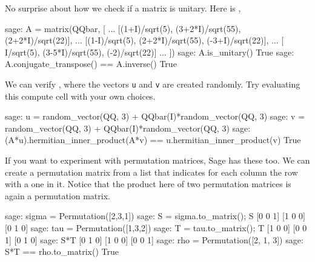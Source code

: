 No surprise about how we check if a matrix is unitary.  Here is ,
%
\begin{sageexample}
sage: A = matrix(QQbar, [
...       [(1+I)/sqrt(5), (3+2*I)/sqrt(55), (2+2*I)/sqrt(22)],
...       [(1-I)/sqrt(5), (2+2*I)/sqrt(55),  (-3+I)/sqrt(22)],
...       [    I/sqrt(5), (3-5*I)/sqrt(55),    (-2)/sqrt(22)]
...                     ])
sage: A.is_unitary()
True
sage: A.conjugate_transpose() == A.inverse()
True
\end{sageexample}
%
We can verify , where the vectors \verb?u? and \verb?v? are created randomly.  Try evaluating this compute cell with your own choices.
%
\begin{sageexample}
sage: u = random_vector(QQ, 3) + QQbar(I)*random_vector(QQ, 3)
sage: v = random_vector(QQ, 3) + QQbar(I)*random_vector(QQ, 3)
sage: (A*u).hermitian_inner_product(A*v) == u.hermitian_inner_product(v)
True
\end{sageexample}
%
If you want to experiment with permutation matrices, Sage has these too.  We can create a permutation matrix from a list that indicates for each column the row with a one in it.  Notice that the product here of two permutation matrices is again a permutation matrix.
%
\begin{sageexample}
sage: sigma = Permutation([2,3,1])
sage: S = sigma.to_matrix(); S
[0 0 1]
[1 0 0]
[0 1 0]
sage: tau = Permutation([1,3,2])
sage: T = tau.to_matrix(); T
[1 0 0]
[0 0 1]
[0 1 0]
sage: S*T
[0 1 0]
[1 0 0]
[0 0 1]
sage: rho = Permutation([2, 1, 3])
sage: S*T == rho.to_matrix()
True
\end{sageexample}
%
\begin{sageverbatim}
\end{sageverbatim}
%




